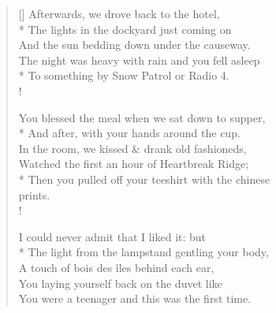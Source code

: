 \settowidth{\versewidth}{Afterwards, we drove back to the hotel, aaaaaaa}
\begin{verse}[\versewidth]
Afterwards, we drove back to the hotel,\\*
\vin The lights in the dockyard just coming on\\
And the sun bedding down under the causeway.\\
\vin The night was heavy with rain and you fell asleep\\*
To something by Snow Patrol or Radio 4.\\!

You blessed the meal when we sat down to supper,\\*
\vin And after, with your hands around the cup.\\
In the room, we kissed \& drank old fashioneds,\\
\vin Watched the first  an hour of {\hoskeroe Heartbreak Ridge};\\*
Then you pulled off your teeshirt with the chinese\\ \vin \vin prints.\\!

I could never admit that I liked it: but\\*
\vin The light from the lampstand gentling your body,\\
A touch of bois des \^iles behind each ear,\\
\vin You laying yourself back on the duvet like\\
You were a teenager and this was the first time.
\end{verse}
